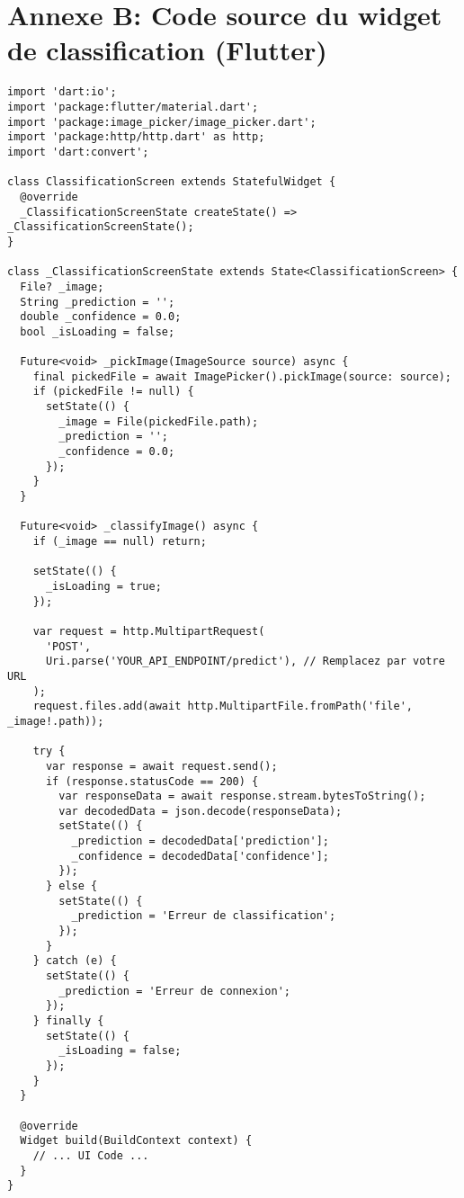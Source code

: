 \documentclass[12pt,a4paper]{report}
\begin{document}
\section*{Annexe B: Code source du widget de classification (Flutter)}
\begin{verbatim}
import 'dart:io';
import 'package:flutter/material.dart';
import 'package:image_picker/image_picker.dart';
import 'package:http/http.dart' as http;
import 'dart:convert';

class ClassificationScreen extends StatefulWidget {
  @override
  _ClassificationScreenState createState() => _ClassificationScreenState();
}

class _ClassificationScreenState extends State<ClassificationScreen> {
  File? _image;
  String _prediction = '';
  double _confidence = 0.0;
  bool _isLoading = false;

  Future<void> _pickImage(ImageSource source) async {
    final pickedFile = await ImagePicker().pickImage(source: source);
    if (pickedFile != null) {
      setState(() {
        _image = File(pickedFile.path);
        _prediction = '';
        _confidence = 0.0;
      });
    }
  }

  Future<void> _classifyImage() async {
    if (_image == null) return;

    setState(() {
      _isLoading = true;
    });

    var request = http.MultipartRequest(
      'POST',
      Uri.parse('YOUR_API_ENDPOINT/predict'), // Remplacez par votre URL
    );
    request.files.add(await http.MultipartFile.fromPath('file', _image!.path));

    try {
      var response = await request.send();
      if (response.statusCode == 200) {
        var responseData = await response.stream.bytesToString();
        var decodedData = json.decode(responseData);
        setState(() {
          _prediction = decodedData['prediction'];
          _confidence = decodedData['confidence'];
        });
      } else {
        setState(() {
          _prediction = 'Erreur de classification';
        });
      }
    } catch (e) {
      setState(() {
        _prediction = 'Erreur de connexion';
      });
    } finally {
      setState(() {
        _isLoading = false;
      });
    }
  }

  @override
  Widget build(BuildContext context) {
    // ... UI Code ...
  }
}
\end{verbatim}
\end{document}
